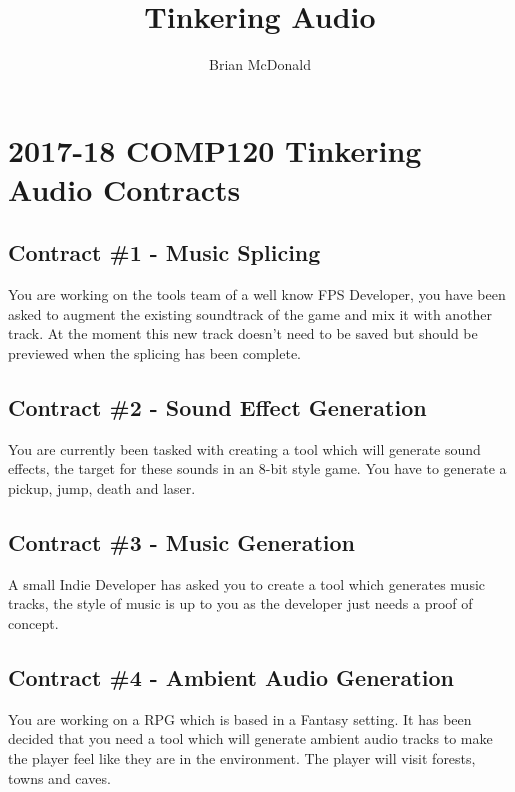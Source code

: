 \documentclass{../../fal_assignment}
\title{Tinkering Audio}
\author{Brian McDonald}
\begin{document}
\section*{2017-18 COMP120 Tinkering Audio Contracts}

\subsection*{Contract \#1 - Music Splicing}
You are working on the tools team of a well know FPS Developer, you have been asked to augment the existing soundtrack of the game and mix it with another track. At the moment this new track doesn't need to be saved but should be previewed when the splicing has been complete.

\subsection*{Contract \#2 - Sound Effect Generation}
You are currently been tasked with creating a tool which will generate sound effects, the target for these sounds in an 8-bit style game. You have to generate a pickup, jump, death and laser. 

\subsection*{Contract \#3 - Music Generation}
A small Indie Developer has asked you to create a tool which generates music tracks, the style of music is up to you as the developer just needs a proof of concept.

\subsection*{Contract \#4 - Ambient Audio Generation}
You are working on a RPG which is based in a Fantasy setting. It has been decided that you need a tool which will generate ambient audio tracks to make the player feel like they are in the environment. The player will visit forests, towns and caves.
\end{document}
